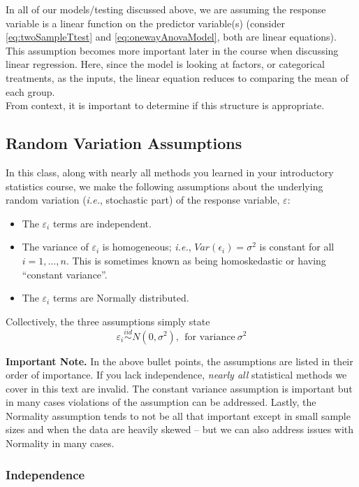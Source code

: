 \documentclass[
]{book}
\providecommand{\tightlist}{%
  \setlength{\itemsep}{0pt}\setlength{\parskip}{0pt}}
\begin{document}
In all of our models/testing discussed above, we are assuming the response variable is a linear function on the predictor variable(s) (consider \eqref{eq:twoSampleTtest} and \eqref{eq:onewayAnovaModel}, both are linear equations).
This assumption becomes more important later in the course when discussing linear regression.
Here, since the model is looking at factors, or categorical treatments, as the inputs, the linear equation reduces to comparing the mean of each group.\\
From context, it is important to determine if this structure is appropriate.

\hypertarget{random-variation-assumptions}{%
\subsection{Random Variation Assumptions}\label{random-variation-assumptions}}

In this class, along with nearly all methods you learned in your introductory statistics course, we make the following assumptions about the underlying random variation (\emph{i.e.}, stochastic part) of the response variable, \(\varepsilon\):

\begin{itemize}
\tightlist
\item
  The \(\varepsilon_i\) terms are independent.
\item
  The variance of \(\varepsilon_i\) is homogeneous; \emph{i.e.}, \(Var(\epsilon_i)=\sigma^2\) is constant for all \(i=1,\ldots,n\). This is sometimes known as being homoskedastic or having ``constant variance''.
\item
  The \(\varepsilon_i\) terms are Normally distributed.
\end{itemize}

Collectively, the three assumptions simply state
\[\varepsilon_i \stackrel{iid}{\sim} N(0, \sigma^2), ~~\textrm{for variance}~\sigma^2\]

\textbf{Important Note.} In the above bullet points, the assumptions are listed in their order of importance.
If you lack independence, \emph{nearly all} statistical methods we cover in this text are invalid.
The constant variance assumption is important but in many cases violations of the assumption can be addressed.
Lastly, the Normality assumption tends to not be all that important except in small sample sizes and when the data are heavily skewed -- but we can also address issues with Normality in many cases.

\hypertarget{independence}{%
\subsubsection{Independence}\label{independence}}
\end{document}
